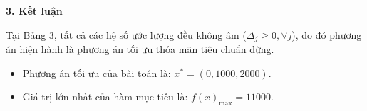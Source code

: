 \textbf{3. Kết luận}

Tại Bảng 3, tất cả các hệ số ước lượng đều không âm ($\Delta_j \ge 0, \forall j$), do đó phương án hiện hành là phương án tối ưu thỏa mãn tiêu chuẩn dừng.
\begin{itemize}
    \item Phương án tối ưu của bài toán là: $x^* = (0, 1000, 2000)$.
    \item Giá trị lớn nhất của hàm mục tiêu là: $f(x)_{\max} = 11000$.
\end{itemize}